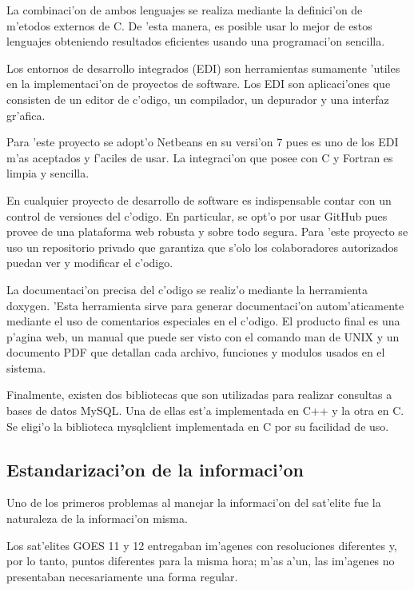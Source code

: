   La combinaci'on de ambos lenguajes se realiza mediante la definici'on de m'etodos externos de C. De 'esta manera, es posible
  usar lo mejor de estos lenguajes obteniendo resultados eficientes usando una programaci'on sencilla.


  Los entornos de desarrollo integrados (EDI) son herramientas sumamente 'utiles en la implementaci'on de proyectos de software.
  Los EDI son aplicaci'ones que consisten de un editor de c'odigo, un compilador, un depurador y una interfaz gr'afica.

  Para 'este proyecto se adopt'o Netbeans en su versi'on 7 pues es uno de los EDI m'as aceptados y f'aciles de usar. La integraci'on
  que posee con C y Fortran es limpia y sencilla.

  En cualquier proyecto de desarrollo de software es indispensable contar con un control de versiones del c'odigo. En particular,
  se opt'o por usar GitHub pues provee de una plataforma web robusta y sobre todo segura. Para 'este proyecto se uso un repositorio
  privado que garantiza que s'olo los colaboradores autorizados puedan ver y modificar el c'odigo.

  La documentaci'on precisa del c'odigo se realiz'o mediante la herramienta doxygen. 'Esta herramienta sirve para generar
  documentaci'on autom'aticamente mediante el uso de comentarios especiales en el c'odigo. El producto final es una p'agina web, un manual 
  que puede ser visto con el comando man de UNIX y un documento PDF que detallan cada archivo, funciones y modulos usados en el sistema.
  

  Finalmente, existen dos bibliotecas que son utilizadas para realizar consultas
  a bases de datos MySQL. Una de ellas est'a implementada en C++ y la otra en C.
  Se eligi'o la biblioteca mysqlclient implementada en C por su facilidad de uso.

\subsection{Estandarizaci'on de la informaci'on}
  Uno de los primeros problemas al manejar la informaci'on del sat'elite fue la naturaleza de la informaci'on 
  misma. 

  Los sat'elites GOES 11 y 12 entregaban im'agenes con resoluciones diferentes y, por lo tanto, puntos 
  diferentes para la misma hora; m'as a'un, las im'agenes no presentaban necesariamente una forma regular.

